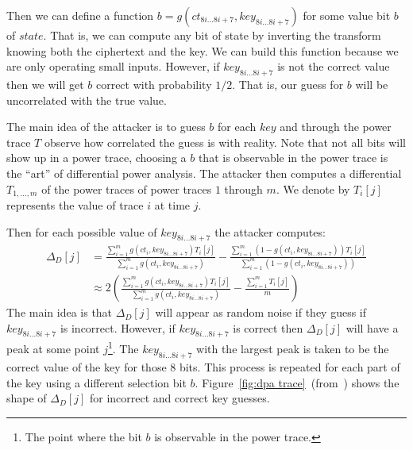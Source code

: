 \documentclass{article}
\begin{document}
Then we can define a function $b = g(ct_{8i...8i+7}, key_{8i...8i+7})$ for some value  bit $b$ of $state$.    That is, we can compute any bit of state by inverting the transform knowing both the ciphertext and the key.  We can build this function because we are only operating small inputs.  However, if $key_{8i...8i+7}$ is not the correct value then we will get $b$ correct with probability $1/2$.  That is, our guess for $b$ will be uncorrelated with the true value.  

The main idea of the attacker is to guess $b$ for each $key$ and through the power trace $T$ observe how correlated the guess is with reality.  Note that not all bits will show up in a power trace, choosing a $b$ that is observable in the power trace is the ``art'' of differential power analysis.  The attacker then computes a differential $T_{1,...,m}$ of the power traces of power traces $1$ through $m$.  We denote by $T_i[j]$ represents the value of trace $i$ at time $j$.

Then for each possible value of $key_{8i...8i+7}$ the attacker computes:
\begin{align*}
\Delta_D[j] &= \frac{\sum_{i=1}^m g(ct_i, key_{8i...8i+7})T_i[j]}{\sum_{i=1}^m g(ct_i, key_{8i...8i+7})}
-\frac{\sum_{i=1}^m (1-g(ct_i, key_{8i...8i+7}))T_i[j]}{\sum_{i=1}^m(1- g(ct_i, key_{8i...8i+7}))}\\
&\approx 2\left(  \frac{\sum_{i=1}^m g(ct_i, key_{8i...8i+7})T_i[j]}{\sum_{i=1}^m g(ct_i, key_{8i...8i+7})} - \frac{\sum_{i=1}^m T_i[j]}{m} \right)
\end{align*}
The main idea is that $\Delta_D[j]$ will appear as random noise if they guess if $key_{8i...8i+7}$ is incorrect.  However, if $key_{8i...8i+7}$ is correct then $\Delta_D[j]$ will have a peak at some point $j$\footnote{The point where the bit $b$ is observable in the power trace.}.  The $key_{8i...8i+7}$ with the largest peak is taken to be the correct value of the key for those $8$ bits.  This process is repeated for each part of the key using a different selection bit $b$.  Figure~\ref{fig:dpa trace}~(from~\cite{kocherDPA}) shows the shape of $\Delta_D[j]$ for incorrect and correct key guesses.
\end{document}
